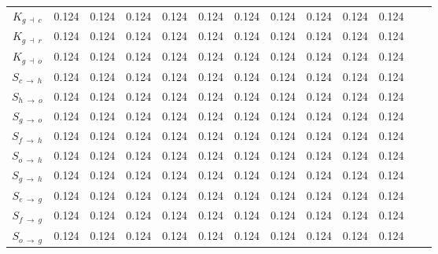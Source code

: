 \begin{ThreePartTable}
\begin{longtable}{c l *{10}{c} c}
        $K_{g \: \dashv \: c}$               & 0.124                    & 0.124 & 0.124 & 0.124 & 0.124 & 0.124 & 0.124 & 0.124 & 0.124 & 0.124 \\

        $K_{g \: \dashv \: r}$               & 0.124                    & 0.124 & 0.124 & 0.124 & 0.124 & 0.124 & 0.124 & 0.124 & 0.124 & 0.124 \\

        $K_{g \: \dashv \: o}$               & 0.124                    & 0.124 & 0.124 & 0.124 & 0.124 & 0.124 & 0.124 & 0.124 & 0.124 & 0.124 \\

        $S_{c \: \rightarrow \: h}$\tnote{f} & 0.124                    & 0.124 & 0.124 & 0.124 & 0.124 & 0.124 & 0.124 & 0.124 & 0.124 & 0.124 \\

        $S_{h \: \rightarrow \: o}$          & 0.124                    & 0.124 & 0.124 & 0.124 & 0.124 & 0.124 & 0.124 & 0.124 & 0.124 & 0.124 \\

        $S_{g \: \rightarrow \: o}$          & 0.124                    & 0.124 & 0.124 & 0.124 & 0.124 & 0.124 & 0.124 & 0.124 & 0.124 & 0.124 \\

        $S_{f \: \rightarrow \: h}$          & 0.124                    & 0.124 & 0.124 & 0.124 & 0.124 & 0.124 & 0.124 & 0.124 & 0.124 & 0.124 \\

        $S_{o \: \rightarrow \: h}$          & 0.124                    & 0.124 & 0.124 & 0.124 & 0.124 & 0.124 & 0.124 & 0.124 & 0.124 & 0.124 \\

        $S_{g \: \rightarrow \: h}$          & 0.124                    & 0.124 & 0.124 & 0.124 & 0.124 & 0.124 & 0.124 & 0.124 & 0.124 & 0.124 \\

        $S_{e \: \rightarrow \: g}$          & 0.124                    & 0.124 & 0.124 & 0.124 & 0.124 & 0.124 & 0.124 & 0.124 & 0.124 & 0.124 \\

        $S_{f \: \rightarrow \: g}$          & 0.124                    & 0.124 & 0.124 & 0.124 & 0.124 & 0.124 & 0.124 & 0.124 & 0.124 & 0.124 \\

        $S_{o \: \rightarrow \: g}$          & 0.124                    & 0.124 & 0.124 & 0.124 & 0.124 & 0.124 & 0.124 & 0.124 & 0.124 & 0.124 \\


\end{longtable}
\end{ThreePartTable}
